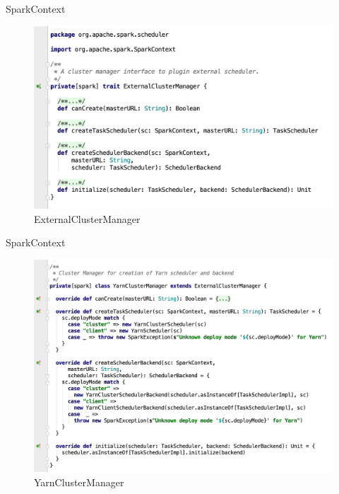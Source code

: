 \begin{frame}[plain,t]{SparkContext} %
	 \\  \vspace{2ex}
	\begin{figure}
		\centering
		\includegraphics[width=0.9\linewidth]{images/init004}
		\caption{ExternalClusterManager}
		\label{fig:init004}
	\end{figure}
	
\end{frame}
\begin{frame}[plain,t]{SparkContext} %
	 \\ 
	\begin{figure}
		\centering
		\includegraphics[width=0.9\linewidth]{images/init005}
		\caption{YarnClusterManager}
		\label{fig:init005}
	\end{figure}
	
\end{frame}
